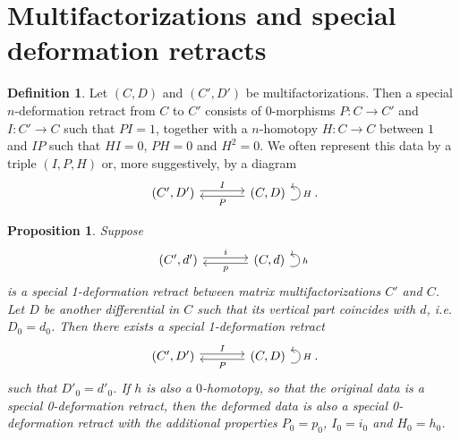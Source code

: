 \documentclass{article}
\newcommand{\DD}{\mathcal{D}}
\DeclareMathOperator{\Ext}{Ext}
\newcommand{\sdr}[5]{%
  \begin{tikzcd}[column sep=large, ampersand replacement=\&]
    {#1} \arrow[r, "{#3}", shift left=0.5ex,] \arrow[r, leftarrow, "{#4}", shift right=0.5ex, swap] \& 
    #2 \arrow[loop right, distance=1em, in=15, out=-15, "{#5}",swap]
  \end{tikzcd}%
}
\theoremstyle{plain} %
\newtheorem{lemma}[theorem]{Lemma}
\newtheorem{proposition}[theorem]{Proposition}
\theoremstyle{definition} %
\newtheorem{definition}[theorem]{Definition}
\theoremstyle{remark} %
\begin{document}
%
%
%
%
%
%

\section{Multifactorizations and special deformation retracts}
\begin{definition}
	Let $(C,D)$ and $(C',D')$ be multifactorizations. Then a special $n$-deformation retract from $C$ to $C'$ consists of 0-morphisms $P:C\to C'$ and $I:C'\to C$ such that $PI=1$, together with a $n$-homotopy $H:C\to C$ between $1$ and $IP$ such that $HI=0$, $PH=0$ and $H^2=0$. We often represent this data by a triple $(I,P,H)$ or, more suggestively, by a diagram
	$$
		\sdr{(C',D')}{(C,D)}{I}{P}{H}
		.
	$$
\end{definition}

\begin{proposition}\label{specialDefRetract}
	Suppose 
	$$\sdr{(C',d')}{(C,d)}{i}{p}{h}$$
	is a special 1-deformation retract between matrix multifactorizations $C'$ and $C$. Let $D$ be another differential in $C$ such that its vertical part coincides with $d$, i.e. $D_0=d_0$. Then there exists a special 1-deformation retract
	$$\sdr{(C',D')}{(C,D)}{I}{P}{H}.$$
	such that $D'_0=d'_0$.
	If $h$ is also a $0$-homotopy, so that the original data is a special 0-deformation retract, then the deformed data is also a special 0-deformation retract with the additional properties $P_0=p_0$, $I_0=i_0$ and $H_0=h_0$.
\end{proposition}
\end{document}
